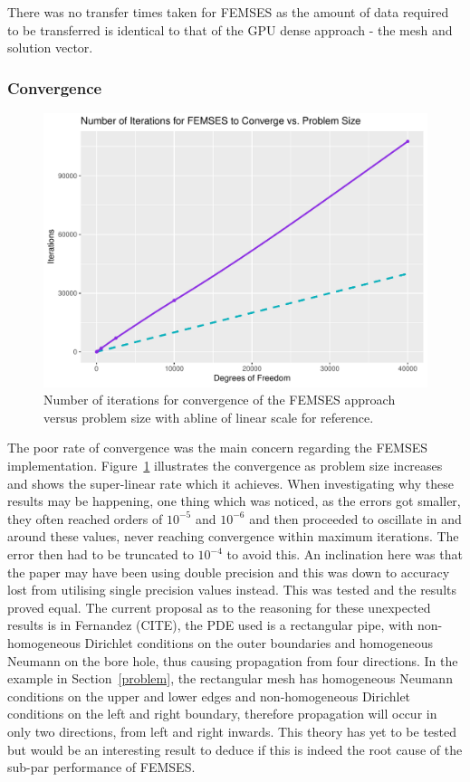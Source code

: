 There was no transfer times taken for FEMSES as the amount of data required to be transferred is identical to that of the GPU dense approach - the mesh and solution vector.
  
\subsubsection{Convergence}

\begin{figure}
	\centering
	\includegraphics[width=0.58\linewidth]{Plots/iters_v_n}
	\caption{Number of iterations for convergence of the FEMSES approach versus problem size with abline of linear scale for reference.}
	\label{fig:converg}
\end{figure}
The poor rate of convergence was the main concern regarding the FEMSES implementation. Figure~\ref{fig:converg} illustrates the convergence as problem size increases and shows the super-linear rate which it achieves. When investigating why these results may be happening, one thing which was noticed, as the errors got smaller, they often reached orders of $10^{-5}$ and $10^{-6}$ and then proceeded to oscillate in and around these values, never reaching convergence within maximum iterations. The error then had to be truncated to $10^{-4}$ to avoid this. An inclination here was that the paper may have been using double precision and this was down to accuracy lost from utilising single precision values instead. This was tested and the results proved equal. The current proposal as to the reasoning for these unexpected results is in Fernandez (CITE), the PDE used is a rectangular pipe, with non-homogeneous Dirichlet conditions on the outer boundaries and homogeneous Neumann on the bore hole, thus causing propagation from four directions. In the example in Section~\ref{problem}, the rectangular mesh has homogeneous Neumann conditions on the upper and lower edges and non-homogeneous Dirichlet conditions on the left and right boundary, therefore propagation will occur in only two directions, from left and right inwards. This theory has yet to be tested but would be an interesting result to deduce if this is indeed the root cause of the sub-par performance of FEMSES. 

